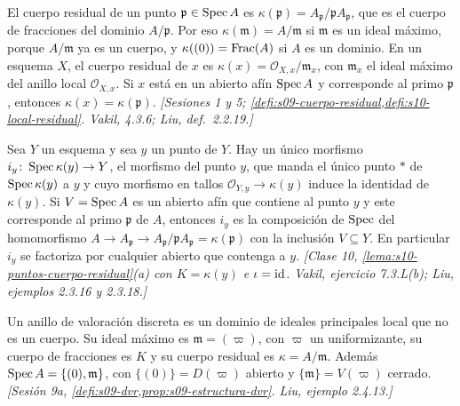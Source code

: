 \begin{defi}
\label{defi:s11-cuerpo-residual}
El cuerpo residual de un punto \(\mathfrak p\in\operatorname{Spec} A\) es \(\kappa(\mathfrak p)=A_{\mathfrak p}/\mathfrak p A_{\mathfrak p}\), que es el cuerpo de fracciones del dominio \(A/\mathfrak p\). Por eso \(\kappa(\mathfrak m)=A/\mathfrak m\) si \(\mathfrak m\) es un ideal máximo, porque \(A/\mathfrak m\) ya es un cuerpo, y \(\kappa((0))=\operatorname{Frac}(A)\) si \(A\) es un dominio. En un esquema \(X\), el cuerpo residual de \(x\) es \(\kappa(x)=\mathcal O_{X,x}/\mathfrak m_x\), con \(\mathfrak m_x\) el ideal máximo del anillo local \(\mathcal O_{X,x}\). Si \(x\) está en un abierto afín \(\operatorname{Spec} A\) y corresponde al primo \(\mathfrak p\), entonces \(\kappa(x)=\kappa(\mathfrak p)\). \emph{[Sesiones 1 y 5; \cref{defi:s09-cuerpo-residual,defi:s10-local-residual}. Vakil, 4.3.6; Liu, def.~2.2.19.]}
\end{defi}

\begin{prop}
\label{prop:s11-punto-esquema}
Sea \(Y\) un esquema y sea \(y\) un punto de \(Y\). Hay un único morfismo \(i_y\colon\operatorname{Spec}\kappa(y)\to Y\), el morfismo del punto \(y\), que manda el único punto \(*\) de \(\operatorname{Spec}\kappa(y)\) a \(y\) y cuyo morfismo en tallos \(\mathcal O_{Y,y}\to\kappa(y)\) induce la identidad de \(\kappa(y)\). Si \(V=\operatorname{Spec} A\) es un abierto afín que contiene al punto \(y\) y este corresponde al primo \(\mathfrak p\) de \(A\), entonces \(i_y\) es la composición de \(\operatorname{Spec}\) del homomorfismo \(A\to A_{\mathfrak p}\to A_{\mathfrak p}/\mathfrak p A_{\mathfrak p}=\kappa(\mathfrak p)\) con la inclusión \(V\subseteq Y\). En particular \(i_y\) se factoriza por cualquier abierto que contenga a \(y\). \emph{[Clase 10, \cref{lema:s10-puntos-cuerpo-residual}(a) con \(K=\kappa(y)\) e \(\iota=\operatorname{id}\). Vakil, ejercicio 7.3.L(b); Liu, ejemplos 2.3.16 y 2.3.18.]}
\end{prop}

\begin{defi}
\label{defi:s11-dvr}
Un anillo de valoración discreta es un dominio de ideales principales local que no es un cuerpo. Su ideal máximo es \(\mathfrak m=(\varpi)\), con \(\varpi\) un uniformizante, su cuerpo de fracciones es \(K\) y su cuerpo residual es \(\kappa=A/\mathfrak m\). Además \(\operatorname{Spec} A=\{(0),\mathfrak m\}\), con \(\{(0)\}=D(\varpi)\) abierto y \(\{\mathfrak m\}=V(\varpi)\) cerrado. \emph{[Sesión 9a, \cref{defi:s09-dvr,prop:s09-estructura-dvr}. Liu, ejemplo 2.4.13.]}
\end{defi}

